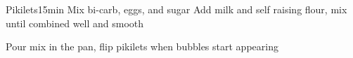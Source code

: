 \begin{recipe}{Pikilets}{}{15min}
Mix bi-carb, eggs, and sugar
Add milk and self raising flour, mix until combined well and smooth

Pour mix in the pan, flip pikilets when bubbles start appearing
\end{recipe}